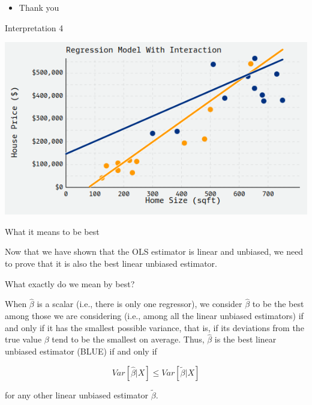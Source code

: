 \documentclass[australian,ignorenonframetext,aspectratio=169]{beamer}
\providecommand{\tightlist}{%
  \setlength{\itemsep}{0pt}\setlength{\parskip}{0pt}}
\begin{document}
\begin{frame}[standout]{}
\protect\hypertarget{section-3}{}

\begin{itemize}
\tightlist
\item
  Thank you
\end{itemize}

\end{frame}

\begin{frame}{Interpretation 4}
\protect\hypertarget{interpretation-4}{}

\begin{center}\includegraphics[width=1\linewidth]{../graphs/interpret-4} \end{center}

\end{frame}

\begin{frame}{What it means to be best}
\protect\hypertarget{what-it-means-to-be-best}{}

Now that we have shown that the OLS estimator is linear and unbiased, we
need to prove that it is also the best linear unbiased estimator.

\begin{block}{What exactly do we mean by best?}

When \(\widehat{\beta}\) is a scalar (i.e., there is only one
regressor), we consider \(\widehat{\beta}\) to be the best among those
we are considering (i.e., among all the linear unbiased estimators) if
and only if it has the smallest possible variance, that is, if its
deviations from the true value \(\beta\) tend to be the smallest on
average. Thus, \(\widehat{\beta}\) is the best linear unbiased estimator
(BLUE) if and only if

\[Var[\widehat{\beta}|X] \leq Var[\widetilde{\beta}|X]\]

for any other linear unbiased estimator \(\widetilde{\beta}\).

\end{block}

\end{frame}
\end{document}
